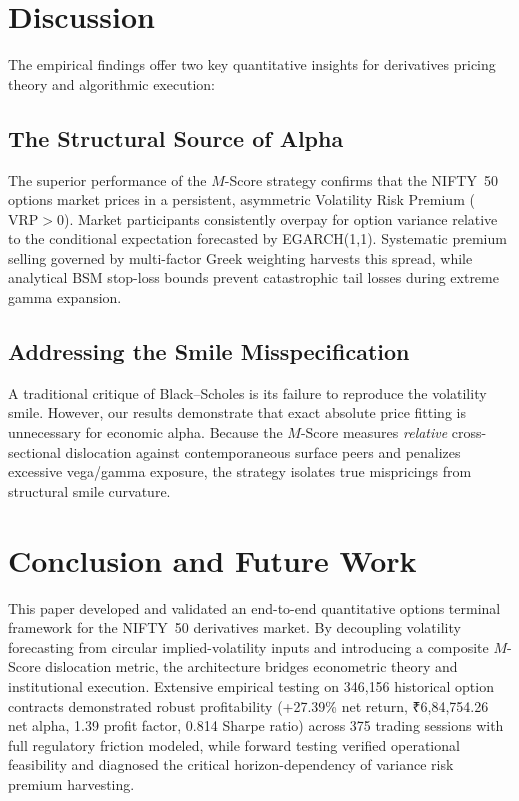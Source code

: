 \documentclass[journal]{IEEEtran}
\begin{document}
\section{Discussion}

The empirical findings offer two key quantitative insights for derivatives pricing theory and algorithmic execution:

\subsection{The Structural Source of Alpha}
The superior performance of the $M$-Score strategy confirms that the NIFTY~50 options market prices in a persistent, asymmetric Volatility Risk Premium ($\mathrm{VRP} > 0$). Market participants consistently overpay for option variance relative to the conditional expectation forecasted by EGARCH(1,1). Systematic premium selling governed by multi-factor Greek weighting harvests this spread, while analytical BSM stop-loss bounds prevent catastrophic tail losses during extreme gamma expansion.

\subsection{Addressing the Smile Misspecification}
A traditional critique of Black--Scholes is its failure to reproduce the volatility smile. However, our results demonstrate that exact absolute price fitting is unnecessary for economic alpha. Because the $M$-Score measures \emph{relative} cross-sectional dislocation against contemporaneous surface peers and penalizes excessive vega/gamma exposure, the strategy isolates true mispricings from structural smile curvature.

\section{Conclusion and Future Work}

This paper developed and validated an end-to-end quantitative options terminal framework for the NIFTY~50 derivatives market. By decoupling volatility forecasting from circular implied-volatility inputs and introducing a composite $M$-Score dislocation metric, the architecture bridges econometric theory and institutional execution. Extensive empirical testing on 346{,}156 historical option contracts demonstrated robust profitability (+27.39\% net return, ₹6,84,754.26 net alpha, 1.39 profit factor, 0.814 Sharpe ratio) across 375 trading sessions with full regulatory friction modeled, while forward testing verified operational feasibility and diagnosed the critical horizon-dependency of variance risk premium harvesting.
\end{document}
